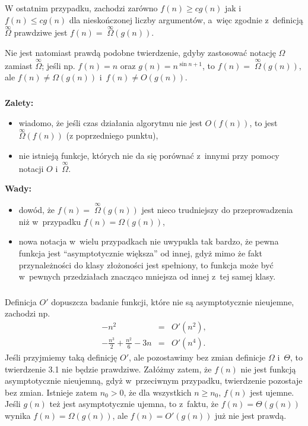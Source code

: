 W ostatnim przypadku, zachodzi zarówno $f(n)\ge cg(n)$ jak i~$f(n)\le cg(n)$ dla nieskończonej liczby argumentów, a~więc zgodnie z~definicją $\stackrel{\infty}{\Omega}$ prawdziwe jest $f(n)=\;\stackrel{\infty}{\Omega}\!\!(g(n))$.

Nie jest natomiast prawdą podobne twierdzenie, gdyby zastosować notację $\Omega$ zamiast $\stackrel{\infty}{\Omega}$; jeśli np. $f(n)=n$ oraz $g(n)=n^{\sin n+1}$, to $f(n)=\;\stackrel{\infty}{\Omega}\!\!(g(n))$, ale $f(n)\ne\Omega(g(n))$ i~$f(n)\ne O(g(n))$.

\subsubsection{} %
\textbf{Zalety:}
\begin{itemize}
	\item wiadomo, że jeśli czas działania algorytmu nie jest $O(f(n))$, to jest $\stackrel{\infty}{\Omega}\!\!(f(n))$ (z poprzedniego punktu),
	\item nie istnieją funkcje, których nie da się porównać z~innymi przy pomocy notacji $O$ i~$\stackrel{\infty}{\Omega}$.
\end{itemize}
\textbf{Wady:}
\begin{itemize}
	\item dowód, że $f(n)=\;\stackrel{\infty}{\Omega}\!\!(g(n))$ jest nieco trudniejszy do przeprowadzenia niż w~przypadku $f(n)=\Omega(g(n))$,
	\item nowa notacja w~wielu przypadkach nie uwypukla tak bardzo, że pewna funkcja jest ``asymptotycznie większa'' od innej, gdyż mimo że fakt przynależności do klasy złożoności jest spełniony, to funkcja może być w~pewnych przedziałach znacząco mniejsza od innej z~tej samej klasy.
\end{itemize}

\subsubsection{} %
Definicja $O'$ dopuszcza badanie funkcji, które nie są asymptotycznie nieujemne, zachodzi np.
\begin{eqnarray*}
	-n^2 &=& O'(n^2), \\
	-\frac{n^3}{2}+\frac{n^2}{6}-3n &=& O'(n^4).
\end{eqnarray*}
Jeśli przyjmiemy taką definicję $O'$, ale pozostawimy bez zmian definicje $\Omega$ i~$\Theta$, to twierdzenie 3.1 nie będzie prawdziwe. Załóżmy zatem, że $f(n)$ nie jest funkcją asymptotycznie nieujemną, gdyż w~przeciwnym przypadku, twierdzenie pozostaje bez zmian. Istnieje zatem $n_0>0$, że dla wszystkich $n\ge n_0$, $f(n)$ jest ujemne. Jeśli $g(n)$ też jest asymptotycznie ujemna, to z~faktu, że $f(n)=\Theta(g(n))$ wynika $f(n)=\Omega(g(n))$, ale $f(n)=O'(g(n))$ już nie jest prawdą.


